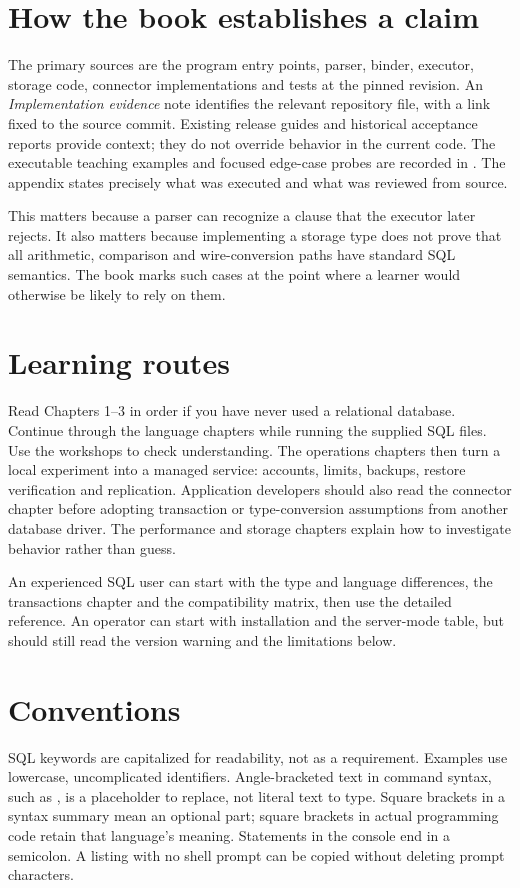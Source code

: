 \section*{How the book establishes a claim}
The primary sources are the program entry points, parser, binder, executor,
storage code, connector implementations and tests at the pinned revision.
An \emph{Implementation evidence} note identifies the relevant repository
file, with a link fixed to the source commit. Existing release guides and
historical acceptance reports provide context; they do not override behavior
in the current code. The executable teaching examples and focused edge-case
probes are recorded in . The appendix states precisely
what was executed and what was reviewed from source.

This matters because a parser can recognize a clause that the executor later
rejects. It also matters because implementing a storage type does not prove
that all arithmetic, comparison and wire-conversion paths have standard SQL
semantics. The book marks such cases at the point where a learner would
otherwise be likely to rely on them.

\section*{Learning routes}
Read Chapters 1--3 in order if you have never used a relational database.
Continue through the language chapters while running the supplied SQL files.
Use the workshops to check understanding. The operations chapters then turn a
local experiment into a managed service: accounts, limits, backups, restore
verification and replication. Application developers should also read the
connector chapter before adopting transaction or type-conversion assumptions
from another database driver. The performance and storage chapters explain
how to investigate behavior rather than guess.

An experienced SQL user can start with the type and language differences,
the transactions chapter and the compatibility matrix, then use the detailed
reference. An operator can start with installation and the server-mode table,
but should still read the version warning and the limitations below.

\section*{Conventions}
SQL keywords are capitalized for readability, not as a requirement. Examples
use lowercase, uncomplicated identifiers. Angle-bracketed text in command
syntax, such as , is a placeholder to replace, not literal
text to type. Square brackets in a syntax summary mean an optional part;
square brackets in actual programming code retain that language's meaning.
Statements in the console end in a semicolon. A listing with no shell prompt
can be copied without deleting prompt characters.

